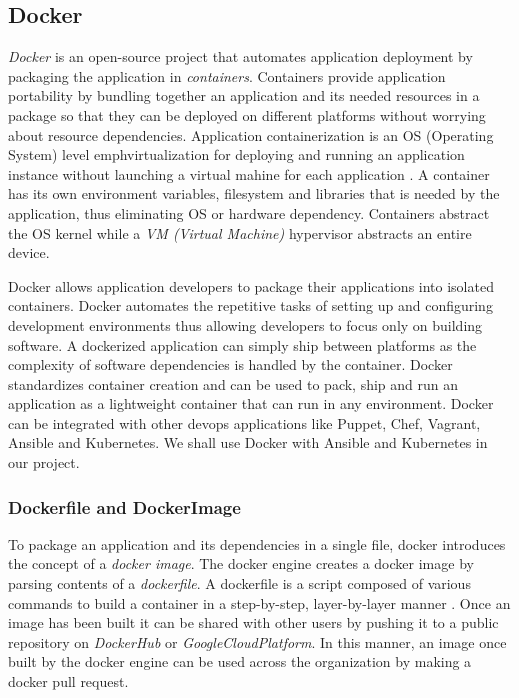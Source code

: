 \documentclass[9pt,twocolumn,twoside]{../../styles/osajnl}
\begin{document}
\subsection{Docker}

\emph{Docker} is an open-source project that automates application
deployment by packaging the application in
\emph{containers}. Containers provide application portability by
bundling together an application and its needed resources in a package
so that they can be deployed on different platforms without worrying
about resource dependencies. Application containerization is an OS
(Operating System) level emph{virtualization} for deploying and
running an application instance without launching a virtual mahine for
each application \cite{www-containerization}. A container has its own
environment variables, filesystem and libraries that is needed by the
application, thus eliminating OS or hardware dependency. Containers
abstract the OS kernel while a \emph{VM (Virtual Machine)} hypervisor
abstracts an entire device.

Docker allows application developers to package their applications
into isolated containers. Docker automates the repetitive tasks of
setting up and configuring development environments thus allowing
developers to focus only on building software. A dockerized
application can simply ship between platforms as the complexity of
software dependencies is handled by the container.  Docker
standardizes container creation and can be used to pack, ship and run
an application as a lightweight container that can run in any
environment. Docker can be integrated with other devops applications
like Puppet, Chef, Vagrant, Ansible and Kubernetes. We shall use
Docker with Ansible and Kubernetes in our project.

\subsubsection{Dockerfile and DockerImage}
To package an application and its dependencies in a single file,
docker introduces the concept of a \emph{docker image}. The docker
engine creates a docker image by parsing contents of a
\emph{dockerfile}. A dockerfile is a script composed of various
commands to build a container in a step-by-step, layer-by-layer manner
\cite{www-docker-digitalocean}. Once an image has been built it can be
shared with other users by pushing it to a public repository on
\emph{DockerHub} or \emph{GoogleCloudPlatform}. In this manner, an
image once built by the docker engine can be used across the
organization by making a docker pull request.
\end{document}

